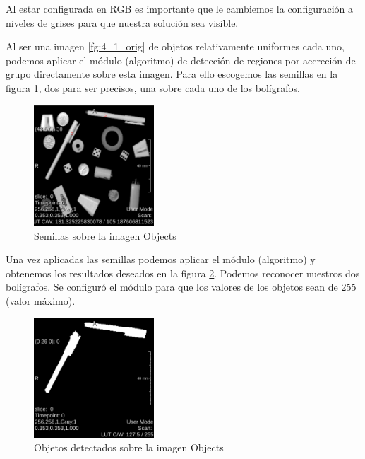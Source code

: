 \documentclass{article}
\begin{document}
\begin{par}
Al estar configurada en RGB es importante que le cambiemos la configuraci\'{o}n a niveles de
grises para que nuestra soluci\'{o}n sea visible.
\end{par}

\begin{par}
Al ser una imagen \ref{fg:4_1_orig} de objetos relativamente uniformes cada uno, podemos
aplicar el m\'{o}dulo (algoritmo) de detecci\'{o}n de regiones por accreci\'{o}n de grupo
directamente sobre esta imagen. Para ello escogemos las semillas en la figura
\ref{fg:4_1_seeds}, dos para ser precisos, una sobre cada uno de los bol\'{i}grafos.
\end{par}

\begin{figure}[ht]
\begin{center}
\includegraphics[width=0.4\textwidth]{4Sintesis/4_1_seeds} %
\caption{Semillas sobre la imagen Objects}
\label{fg:4_1_seeds}
\end{center}
\end{figure}
\FloatBarrier

\begin{par}
Una vez aplicadas las semillas podemos aplicar el m\'{o}dulo (algoritmo) y obtenemos los
resultados deseados en la figura \ref{fg:4_1_objects}. Podemos reconocer nuestros dos
bol\'{i}grafos. Se configur\'{o} el m\'{o}dulo para que los valores de los objetos sean de 255 (valor m\'{a}ximo).
\end{par}

\begin{figure}[ht]
\begin{center}
\includegraphics[width=0.4\textwidth]{4Sintesis/4_1_objects} %
\caption{Objetos detectados sobre la imagen Objects}
\label{fg:4_1_objects}
\end{center}
\end{figure}
\FloatBarrier
\end{document}

